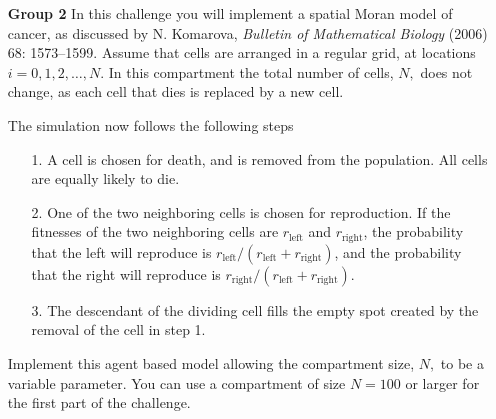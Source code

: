 \documentclass[12pt]{article}
\begin{document}
\begin{enumerate}
\item[\bf Group 2] In this challenge you will implement a spatial Moran model of cancer, as 
discussed by N. Komarova, \emph{Bulletin of Mathematical Biology} (2006) 68: 1573--1599.
Assume that cells  are arranged in a regular grid, at locations $i = 0, 1, 2, \ldots , N$. 
In this compartment the total number of cells, $N,$ does not change, as each cell that dies
is replaced by a new cell. 

The simulation now follows the following steps
\begin{enumerate} 
\item[1.] A cell is chosen for death, and is removed from the population.
All cells are equally likely to die.
\item[2.] One of the two neighboring cells is chosen for reproduction. 
If the fitnesses of the two neighboring cells are $r_{\text{left}}$ and $r_{\text{right}}$, the 
probability that the left will reproduce is $r_{\text{left}}/(r_{\text{left}}+ r_{\text{right}})$, 
and the probability that the right will reproduce is $r_{\text{right}}/(r_{\text{left}}+ r_{\text{right}})$.
\item[3.] The
descendant of the dividing cell fills the empty spot created by the removal of the cell in step 1. 
\end{enumerate} 
 Implement this agent based model allowing the compartment size, $N,$ to be a variable parameter.  
You can use a compartment of size $N = 100$ or larger for the first part of the challenge. 


\end{enumerate}
\end{document}
